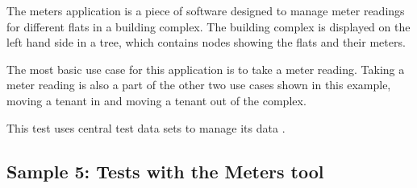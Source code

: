 The meters application is a piece of software designed to manage meter readings for different flats in a building complex. The building complex is displayed on the left hand side in a tree, which contains nodes showing the flats and their meters. 

The most basic use case for this application is to take a meter reading. Taking a meter reading is also a part of the other two use cases shown in this example, moving a tenant in and moving a tenant out of the complex. 

This test uses central test data sets to manage its data . 



\subsection{Sample 5: Tests with the Meters tool}



